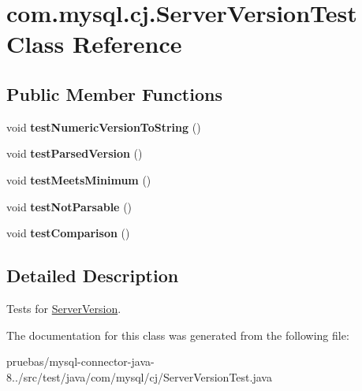 \hypertarget{classcom_1_1mysql_1_1cj_1_1_server_version_test}{}\section{com.\+mysql.\+cj.\+Server\+Version\+Test Class Reference}
\label{classcom_1_1mysql_1_1cj_1_1_server_version_test}
\subsection*{Public Member Functions}
\begin{DoxyCompactItemize}
\item 
\mbox{\label{classcom_1_1mysql_1_1cj_1_1_server_version_test_ae90335d8e7d8ea17b691a83938f12d4b}} 
void {\bfseries test\+Numeric\+Version\+To\+String} ()
\item 
\mbox{\label{classcom_1_1mysql_1_1cj_1_1_server_version_test_a8a61c0c82091deadffbd37452e9babe5}} 
void {\bfseries test\+Parsed\+Version} ()
\item 
\mbox{\label{classcom_1_1mysql_1_1cj_1_1_server_version_test_adff5ed1aaaa77aa090f5c400f03f6b8e}} 
void {\bfseries test\+Meets\+Minimum} ()
\item 
\mbox{\label{classcom_1_1mysql_1_1cj_1_1_server_version_test_ae201a653f64fca24101dfa558d6acf71}} 
void {\bfseries test\+Not\+Parsable} ()
\item 
\mbox{\label{classcom_1_1mysql_1_1cj_1_1_server_version_test_a1a39218e12e065e998d28b6992eff6ac}} 
void {\bfseries test\+Comparison} ()
\end{DoxyCompactItemize}


\subsection{Detailed Description}
Tests for \mbox{\hyperlink{classcom_1_1mysql_1_1cj_1_1_server_version}{Server\+Version}}. 

The documentation for this class was generated from the following file\+:\begin{DoxyCompactItemize}
\item 
pruebas/mysql-\/connector-\/java-\/8../src/test/java/com/mysql/cj/Server\+Version\+Test.\+java\end{DoxyCompactItemize}

